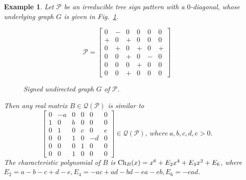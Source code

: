 \documentclass[a4paper, 10pt]{article}
\newtheorem{eg}{Example}[section]
\numberwithin{equation}{section}
\def\Ch{{\rm Ch}}
\begin{document}
\begin{eg}
	Let $\mathcal{P}$ be an irreducible tree sign pattern with a $0$-diagonal, whose underlying graph $G$ is given in Fig.~\ref{X.1}.
	\begin{figure}[H]
		\centering
		\begin{minipage}{.45\textwidth}
			\vspace{-1cm}
			\[
			\mathcal{P}=\begin{bmatrix}
				0 & - & 0 & 0 & 0 & 0 \\
				+ & 0 & + & 0 & 0 & 0 \\
				0 & + & 0 & + & 0 & + \\
				0 & 0 & + & 0 & - & 0 \\
				0 & 0 & 0 & + & 0 & 0 \\
				0 & 0 & + & 0 & 0 & 0
			\end{bmatrix}
			\]
		\end{minipage}
		\hspace{0.05\textwidth}
		\begin{minipage}{.45\textwidth}
			\centering
			\tikzset{node distance=1cm}
			\caption{Signed undirected graph $G$ of $\mathcal{P}$.}
			\label{X.1}
		\end{minipage}
	\end{figure}
	
	Then any real matrix $B\in \mathcal{Q}(\mathcal{P})$ is similar to\\		
	$$
	\begin{bmatrix}
		0 & -a &  0&0  &0  & 0  \\
		1 & 0 & b  & 0&0 &0    \\
		0& 1 & 0  & c  & 0&e  \\
		0&0 & 1   & 0  & -d &0  \\
		0&0  &  0   & 1 & 0 & 0\\
		0&0  &  1 &  0& 0  & 0
	\end{bmatrix}\in \mathcal{Q}(\mathcal{P}),~ where~ a,b,c,d,e>0.$$
	The characteristic polynomial of $B$ is $\Ch_{B}(x)= x^6+E_2 x^4+E_4x^2+E_6$, where $E_2=a-b-c+d-e, E_4= -ac+ad-bd-ea-eb, E_6=-ead$.
	

\end{eg}
\end{document}
